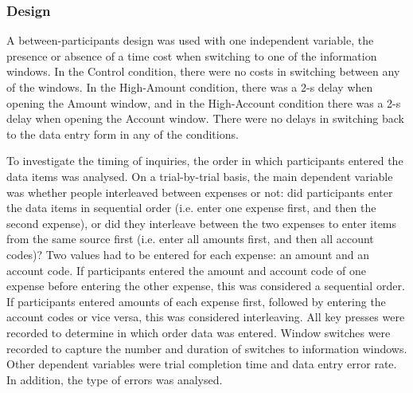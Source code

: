 \subsubsection{Design}
A between-participants design was used with one independent variable, the presence or absence of a time cost when switching to one of the information windows. In the Control condition, there were no costs in switching between any of the windows. In the High-Amount condition, there was a 2-s delay when opening the Amount window, and in the High-Account condition there was a 2-s delay when opening the Account window. There were no delays in switching back to the data entry form in any of the conditions. 

To investigate the timing of inquiries, the order in which participants entered the data items was analysed. On a trial-by-trial basis, the main dependent variable was whether people interleaved between expenses or not: did participants enter the data items in sequential order (i.e. enter one expense first, and then the second expense), or did they interleave between the two expenses to enter items from the same source first (i.e. enter all amounts first, and then all account codes)? Two values had to be entered for each expense: an amount and an account code. If participants entered the amount and account code of one expense before entering the other expense, this was considered a sequential order. If participants entered amounts of each expense first, followed by entering the account codes or vice versa, this was considered interleaving. All key presses were recorded to determine in which order data was entered. Window switches were recorded to capture the number and duration of switches to information windows. Other dependent variables were trial completion time and data entry error rate. In addition, the type of errors was analysed. 

